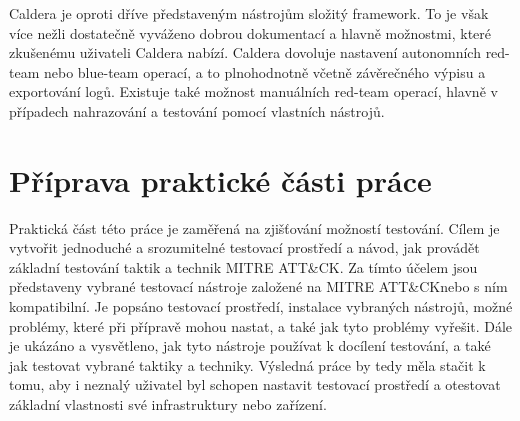 Caldera je oproti dříve představeným nástrojům složitý framework.
To je však více nežli dostatečně vyváženo dobrou dokumentací a hlavně možnostmi, které zkušenému uživateli Caldera nabízí.
Caldera dovoluje nastavení autonomních red-team nebo blue-team operací, a to plnohodnotně včetně závěrečného výpisu a exportování logů.
Existuje také možnost manuálních red-team operací, hlavně v případech nahrazování a testování pomocí vlastních nástrojů.\cite{mitre_caldera_docs}


\section{Příprava praktické části práce}\label{sec:prakticka-cast}
Praktická část této práce je zaměřená na zjišťování možností testování.
Cílem je vytvořit jednoduché a srozumitelné testovací prostředí a návod, jak provádět základní testování taktik a technik MITRE ATT\&CK\@.
Za tímto účelem jsou představeny vybrané testovací nástroje založené na MITRE ATT\&CK\@ nebo s ním kompatibilní.
Je popsáno testovací prostředí, instalace vybraných nástrojů, možné problémy, které při přípravě mohou nastat, a také jak tyto problémy vyřešit.
Dále je ukázáno a vysvětleno, jak tyto nástroje používat k docílení testování, a také jak testovat vybrané taktiky a techniky.
Výsledná práce by tedy měla stačit k tomu, aby i neznalý uživatel byl schopen nastavit testovací prostředí a otestovat základní vlastnosti své infrastruktury nebo zařízení.


